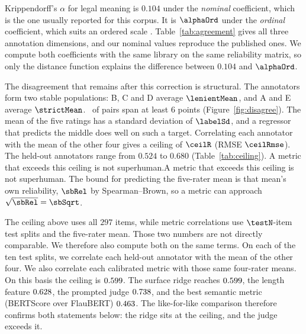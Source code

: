 \documentclass{BVP_JCLLT}
\newcommand{\rev}[1]{#1}
\newcommand{\rev}[1]{{\color{revcol}#1}}
\begin{document}
\rev{Krippendorff's $\alpha$ for legal meaning is $0.104$ under the
\emph{nominal} coefficient, which is the one usually reported for this corpus. It
is $\alphaOrd$ under the \emph{ordinal} coefficient, which suits an ordered
scale \cite{krippendorff2004content}. Table~\ref{tab:agreement} gives all three
annotation dimensions, and our nominal values reproduce the published ones. We
compute both coefficients with the same library on the same reliability matrix,
so only the distance function explains the difference between $0.104$ and
$\alphaOrd$.

The disagreement that remains after this correction is structural. The
annotators form two stable populations: B, C and D average $\lenientMean$, and A
and E average $\strictMean$. \pctSpreadSix\ of pairs span at least $6$ points
(Figure~\ref{fig:disagree}). The mean of the five ratings has a standard
deviation of $\labelSd$, and a regressor that predicts the middle does well on
such a target. Correlating each annotator with the mean of the other four gives
a ceiling of $\ceilR$ (RMSE $\ceilRmse$). The held-out annotators range from
$0.524$ to $0.680$ (Table~\ref{tab:ceiling}).} \rev{A metric that exceeds
this ceiling is not superhuman.A metric that exceeds
this ceiling is not superhuman. The bound for predicting the five-rater mean is
that mean's own reliability, $\sbRel$ by Spearman--Brown, so a metric can
approach $\sqrt{\sbRel}=\sbSqrt$.

The ceiling above uses all $297$ items, while metric correlations use
$\testN$-item test splits and the five-rater mean. Those two numbers are not
directly comparable. We therefore also compute both on the same terms. On each of
the ten test splits, we correlate each held-out annotator with the mean of the
other four. We also correlate each calibrated metric with those same four-rater
means. On this basis the ceiling is $0.599$. The surface ridge reaches
$0.599$, the length feature $0.628$, the prompted judge
$0.738$, and the best semantic metric (BERTScore over FlauBERT)
$0.463$. The like-for-like comparison therefore confirms both statements
below: the ridge sits at the ceiling, and the judge exceeds it.}

\begin{table}
\centering
\caption{Krippendorff's $\alpha$ on \textsc{FrJudge}. Legal meaning is an
ordinal ten-point scale, for which the nominal coefficient is not the
appropriate measure. \emph{prev.}\ is the value reported by Beauchemin et al.\
\cite{beauchemin2025judgebert}.}\label{tab:agreement}
\small

\end{table}
\end{document}
